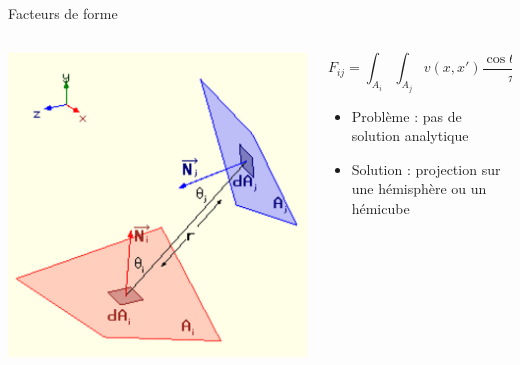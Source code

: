\begin{frame}{Facteurs de forme}

    \begin{columns}
        \begin{column}{.4\textwidth}
            \includegraphics[width=\columnwidth]{figs/ff.png}
        \end{column}
        \begin{column}{.6\textwidth}
            $$
            F_{ij} = \int_{A_i} \int_{A_j} v(x,x') \frac{\cos \theta \cos \theta'}{\pi r^2} dx dx'
        $$
        
        \begin{itemize}
            \item Problème : pas de solution analytique 
            \item Solution : projection sur une hémisphère ou un hémicube 
        \end{itemize}
                    
        \end{column}
    \end{columns}
\end{frame}

